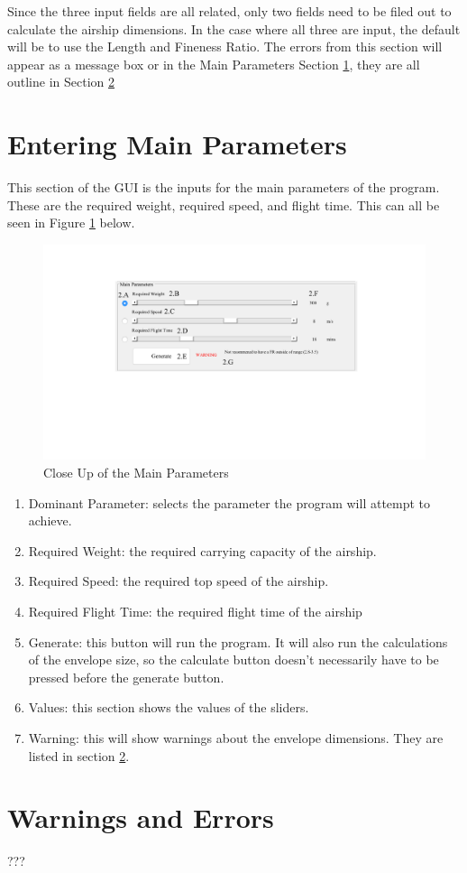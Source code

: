 \documentclass[../main.tex]{subfiles}
\begin{document}
Since the three input fields are all related, only two fields need to be filed out to calculate the airship dimensions. In the case where all three are input, the default will be to use the Length and Fineness Ratio. The errors from this section will appear as a message box or in the Main Parameters Section \ref{gui:parameters}, they are all outline in Section \ref{gui:error}

\section{Entering Main Parameters} \label{gui:parameters}
This section of the GUI is the inputs for the main parameters of the program. These are the required weight, required speed, and flight time. This can all be seen in Figure \ref{fig:gui2} below.

\begin{figure}[H]
	\centering
	\includegraphics[width=0.7\linewidth]{img/gui/guiSection2.pdf}
	\caption{Close Up of the Main Parameters}
	\label{fig:gui2}
\end{figure}

\begin{enumerate} [	A]
	\item Dominant Parameter: selects the parameter the program will attempt to achieve.
	\item Required Weight: the required carrying capacity of the airship.
	\item Required Speed: the required top speed of the airship.
	\item Required Flight Time: the required flight time of the airship
	\item Generate: this button will run the program. It will also run the calculations of the envelope size, so the calculate button doesn't necessarily have to be pressed before the generate button.
	\item Values: this section shows the values of the sliders.
	\item Warning: this will show warnings about the envelope dimensions. They are listed in section \ref{gui:error}.
\end{enumerate}

\section{Warnings and Errors} \label{gui:error}
???


\pagebreak
\end{document}
